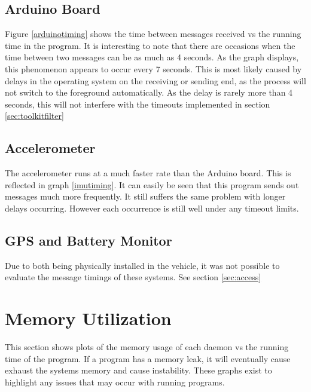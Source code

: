 \subsection{Arduino Board}

Figure \ref{arduinotiming} shows the time between messages received vs the running time in the program. It is interesting to note that there are occasions when the time between two messages can be as much as 4 seconds. As the graph displays, this phenomenon appears to occur every 7 seconds. This is most likely caused by delays in the operating system on the receiving or sending end, as the process will not switch to the foreground automatically. As the delay is rarely more than 4 seconds, this will not interfere with the timeouts implemented in section \ref{sec:toolkitfilter}


\subsection{Accelerometer}

The accelerometer runs at a much faster rate than the Arduino board. This is reflected in graph \ref{imutiming}. It can easily be seen that this program sends out messages much more frequently.  It still suffers the same problem with longer delays occurring. However each occurrence is still well under any timeout limits. 


\subsection{GPS and Battery Monitor}

Due to both being physically installed in the vehicle, it was not possible to evaluate the message timings of these systems. See section \ref{sec:access}


\section{Memory Utilization}
\label{sec:memutilization}

This section shows plots of the memory usage of each daemon vs the running time of the program. If a program has a memory leak, it will eventually cause exhaust the systems memory and cause instability. These graphs exist to highlight any issues that may occur with running programs.

